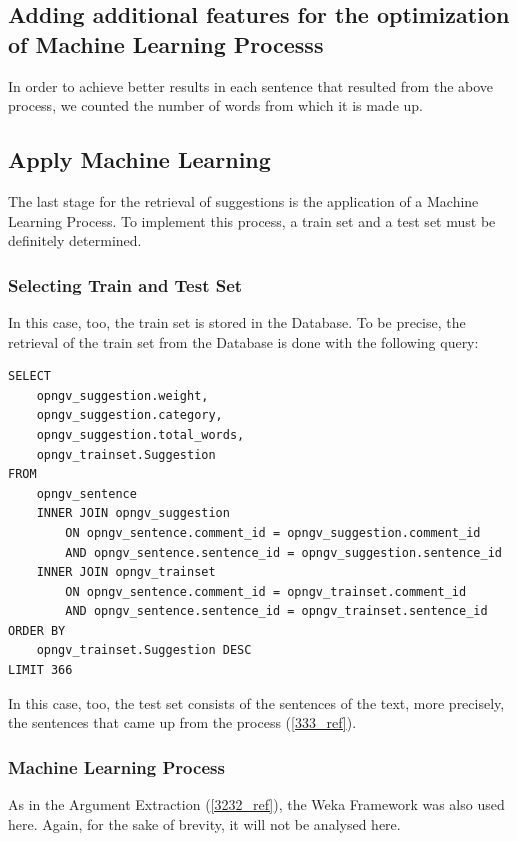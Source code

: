 \subsection{Adding additional features for the optimization of Machine Learning Processs}\label{334_ref}
In order to achieve better results in each sentence that resulted from the above process, we counted the number of words from which it is made up.

\subsection{Apply Machine Learning}\label{335_ref}
The last stage for the retrieval of suggestions is the application of a Machine Learning Process. To implement this process, a train set and a test set must be definitely determined.

\subsubsection{Selecting Train and Test Set}\label{3351_ref}
In this case, too, the train set is stored in the Database. To be precise, the retrieval of the train set from the Database is done with the following query:\\

\lstset{language=SQL}
\begin{lstlisting}[frame=single, basicstyle=\small]
SELECT
	opngv_suggestion.weight,
	opngv_suggestion.category,
	opngv_suggestion.total_words,
	opngv_trainset.Suggestion
FROM
	opngv_sentence
	INNER JOIN opngv_suggestion
		ON opngv_sentence.comment_id = opngv_suggestion.comment_id
		AND opngv_sentence.sentence_id = opngv_suggestion.sentence_id
	INNER JOIN opngv_trainset
		ON opngv_sentence.comment_id = opngv_trainset.comment_id
		AND opngv_sentence.sentence_id = opngv_trainset.sentence_id
ORDER BY
	opngv_trainset.Suggestion DESC
LIMIT 366
\end{lstlisting}

In this case, too, the test set consists of the sentences of the text, more precisely, the sentences that came up from the process (\ref{333_ref}).

\subsubsection{Machine Learning Process}\label{3352_ref}
As in the Argument Extraction (\ref{3232_ref}), the Weka Framework was also used here. Again, for the sake of brevity, it will not be analysed here.

